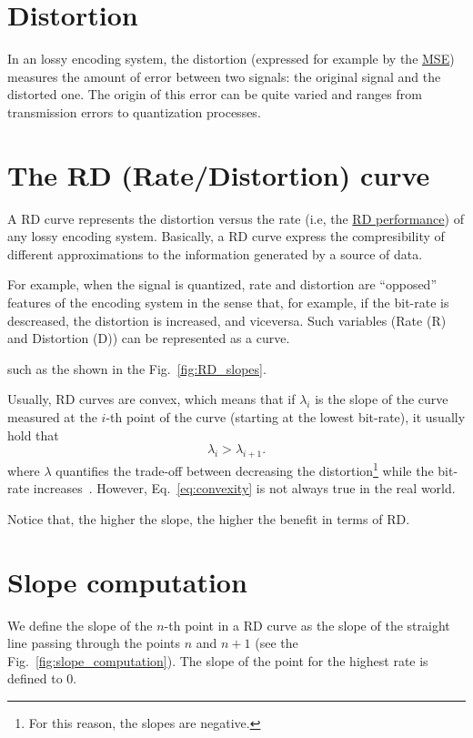 \section{Distortion}

In an lossy encoding system, the distortion (expressed for example by
the \href{https://en.wikipedia.org/wiki/Mean_squared_error}{MSE})
measures the amount of error between two signals: the original signal
and the distorted one. The origin of this error can be quite varied
and ranges from transmission errors to quantization processes.

\section{The RD (Rate/Distortion) curve}

A RD curve represents the distortion versus the rate (i.e, the
\href{https://en.wikipedia.org/wiki/Rate-distortion_theory}{RD
  performance}) of any lossy encoding system. Basically, a RD curve
express the compresibility of different approximations to the
information generated by a source of data.

For example, when the signal is quantized, rate and distortion are
``opposed'' features of the encoding system in the sense that, for
example, if the bit-rate is descreased, the distortion is increased,
and viceversa. Such variables (Rate (R) and Distortion (D)) can be
represented as a curve.

such as the shown in the
Fig.~\ref{fig:RD_slopes}.


Usually, RD curves are convex, which means
that if $\lambda_i$ is the slope of the curve measured at the $i$-th
point of the curve (starting at the lowest bit-rate), it usually hold
that
\begin{equation}
  \lambda_i > \lambda_{i+1}.
  \label{eq:convexity}
\end{equation}
where $\lambda$ quantifies the trade-off between decreasing the
distortion\footnote{For this reason, the slopes are negative.} while
the bit-rate
increases~\cite{vetterli1995wavelets,sayood2017introduction}. However,
Eq.~\eqref{eq:convexity} is not always true in the real world.

Notice that, the higher the slope, the higher the benefit in terms of RD.


\section{Slope computation}
We define the slope of the                            
    $n$-th point in a RD curve as the slope of the straight line                             
    passing through the points $n$ and $n+1$ (see the                                        
    Fig.~\ref{fig:slope_computation}). The slope of the point for the                        
    highest rate is defined to $0$.

